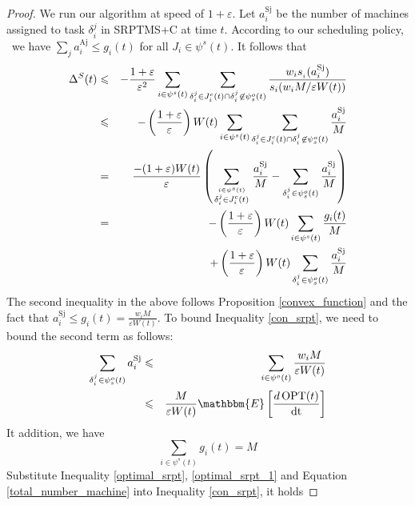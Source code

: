 \documentclass[10pt,conference,compsocconf,letterpaper]{IEEEtran}
\newcommand{\nin}{\not\in}
\newcommand{\tmop}[1]{\ensuremath{\operatorname{#1}}}
\begin{document}
\begin{proof}
We run our algorithm at speed of $1 + \varepsilon$. Let $a^{\tmop{Sj}}_i$ be
the number of machines assigned to task $\delta^j_i$ in SRPTMS+C at time $t$.
According to our scheduling policy, \ we have $\sum_j a_i^{\tmop{Aj}}
\leqslant g_i (t)$ for all $J_i \in \psi^s (t)$. It follows that
\begin{eqnarray}
\label{con_srpt}
  \Delta_{}^S (t) & \leqslant & - \frac{1 + \varepsilon}{\varepsilon^2}
  \sum_{i \text{} \in \psi^s (t)} \sum_{\delta^j_i \in J_i^c (t) \cap
  \delta^{^j}_i \nin \psi^o_s (t)} \frac{w_i s_{_i} (a_i^{\tmop{Sj}})}{s_i
  (w_i M / \varepsilon W (t))} \nonumber\\
  & \leqslant & - \left( \frac{1 + \varepsilon}{\varepsilon^{}} \right) W (t)
  \sum_{i \text{} \in \psi^s (t)} \sum_{\delta^j_i \in J_i^c (t) \cap
  \delta^{^j}_i \nin \psi^o_s (t)} \frac{a_i^{\tmop{Sj}}}{M} \nonumber\\
  & = & \frac{- (1 + \varepsilon) W (t)}{\varepsilon^{}} \left( \sum_{i
  \text{} \in \psi^s (t) \atop \scriptstyle \delta^j_i \in J_i^c (t)} \frac{a_i^{\tmop{Sj}}}{M}
  - \sum_{\delta^{^j}_i \in \psi^o_s (t)} \frac{a_i^{\tmop{Sj}}}{M} \right)
  \nonumber\\
  & = & - \left( \frac{1 + \varepsilon}{\varepsilon^{}} \right) W (t) \sum_{i
  \text{} \in \psi^s (t)} \frac{g_i (t)}{M} \nonumber\\
  &  & + \left( \frac{1 + \varepsilon}{\varepsilon^{}} \right) W (t)
  \sum_{\delta^{^j}_i \in \psi^o_s (t)} \frac{a_i^{\tmop{Sj}}}{M}
\end{eqnarray}
The second inequality in the above follows Proposition \ref{convex_function} and the fact that
$a_i^{\tmop{Sj}} \leqslant g_i (t) = \frac{w_i M}{\varepsilon W (t)}$. To
bound Inequality \eqref{con_srpt}, we need to bound the second term as follows:
\begin{eqnarray}
\label{optimal_srpt}
  \sum_{\delta^{^j}_i \in \psi^o_s (t)} a_i^{\tmop{Sj}} & \leqslant & \sum_{i
  \in \psi^o (t)} \frac{w_i M}{\varepsilon W (t)} \\
  \label{optimal_srpt_1}
  & \leqslant & \frac{M}{\varepsilon W (t)} \mathbbm{E} \left[ \frac{d
  \tmop{OPT} (t)}{\tmop{dt}} \right]
\end{eqnarray}
It addition, we have
\begin{equation}
\label{total_number_machine}
  \sum_{i \text{} \in \psi^s (t)} g_i (t) = M
\end{equation}
Substitute Inequality \eqref{optimal_srpt}, \eqref{optimal_srpt_1} and Equation \eqref{total_number_machine} into Inequality \eqref{con_srpt}, it holds

\end{proof}
\end{document}
